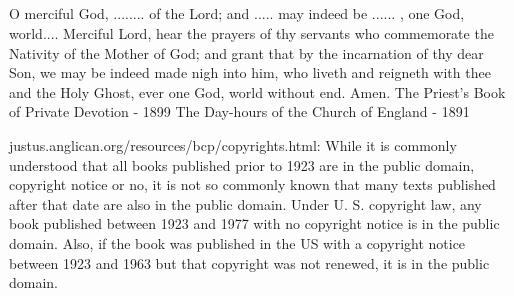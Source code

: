 \subsection{}





O merciful God, ........ of the Lord; and ..... may indeed be ...... , one God, world....
Merciful Lord, hear the prayers of thy servants who commemorate the Nativity of the Mother of God; and grant that by the incarnation of thy dear Son, we may be indeed made nigh into him, who liveth and reigneth with thee and the Holy Ghost, ever one God, world without end.  Amen.
The Priest's Book of Private Devotion - 1899
The Day-hours of the Church of England - 1891

justus.anglican.org/resources/bcp/copyrights.html:
While it is commonly understood that all books published prior to 1923 are in the public domain, copyright notice or no, it is not so commonly known that many texts published after that date are also in the public domain. Under U. S. copyright law, any book published between 1923 and 1977 with no copyright notice is in the public domain. Also, if the book was published in the US with a copyright notice between 1923 and 1963 but that copyright was not renewed, it is in the public domain.